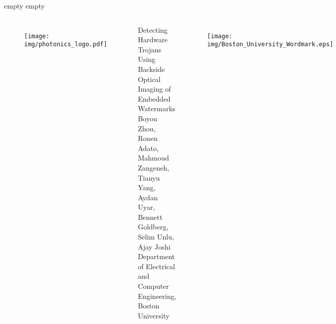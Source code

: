 \documentclass{beamer}
\newcommand{\titlebox}{
    \begin{center}
        \begin{tcolorbox}[left=2cm,right=2cm,arc=2cm,boxrule=5mm,width=\textwidth,colframe=blue!70!black,colback=yellow!5]
            \begin{center}
}
\newcommand{\titleboxend}{
            \end{center}
        \end{tcolorbox}
    \end{center}
}
\begin{document}
    {\color{white}empty empty}\\
    \begin{columns}
            \begin{figure}
                \texttt{[image: img/photonics\_logo.pdf]}
            \end{figure}
            \titlebox
            \Huge{Detecting Hardware Trojans Using Backside Optical Imaging of
            Embedded Watermarks}\\
            \large{Boyou Zhou, Ronen Adato, Mahmoud Zangeneh, Tianyu Yang, Aydan
            Uyar, \\Bennett Goldberg, Selim Unlu, Ajay Joshi\\}
            \large{ Department of Electrical and Computer Engineering, Boston
            University \\}
            \titleboxend
            \begin{figure}
                \texttt{[image: img/Boston\_University\_Wordmark.eps]}
            \end{figure}
    \end{columns}
    \vspace{0.2in}
\end{document}
